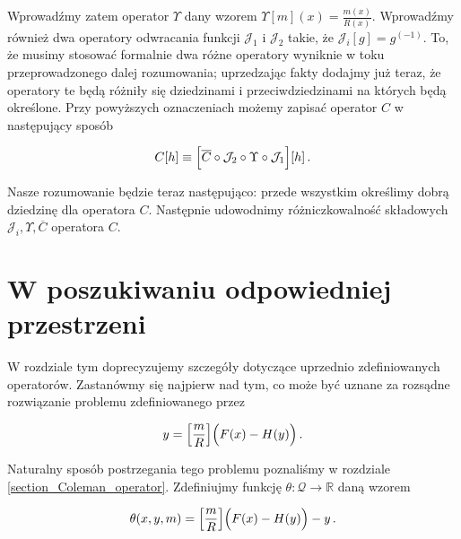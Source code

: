 Wprowadźmy zatem operator $\Upsilon$ dany wzorem $\Upsilon[m](x)= \frac{m(x)}{R(x)}$. Wprowadźmy również dwa operatory odwracania funkcji $\mathcal{J}_1$ i $\mathcal{J}_2$ takie, że $\mathcal{J}_i [g] = g^{(-1)}$. To, że musimy stosować formalnie dwa różne operatory wyniknie w toku przeprowadzonego dalej rozumowania; uprzedzając fakty dodajmy już teraz, że operatory te będą różniły się dziedzinami i przeciwdziedzinami na których będą określone. Przy powyższych oznaczeniach możemy zapisać operator $C$ w następujący sposób

\begin{equation*}
	C[h] \equiv \Bigl[\overline{C} \circ \mathcal{J}_2 \circ \Upsilon \circ \mathcal{J}_1 \Bigl][h]\,.
\end{equation*}

Nasze rozumowanie będzie teraz następująco: przede wszystkim określimy dobrą dziedzinę dla operatora $C$. Następnie udowodnimy różniczkowalność składowych $\mathcal{J}_i, \Upsilon, \overline{C}$ operatora $C$.




\section{W poszukiwaniu odpowiedniej przestrzeni}\label{chap_right_space}


W rozdziale tym doprecyzujemy szczegóły dotyczące uprzednio zdefiniowanych operatorów. Zastanówmy się najpierw nad tym, co może być uznane za rozsądne rozwiązanie problemu zdefiniowanego przez

\begin{equation*}
y= \Bigl [\frac{m}{R}\Bigl] \Big ( F(x) - H(y) \Big)\,.
\end{equation*}

Naturalny sposób postrzegania tego problemu poznaliśmy w rozdziale \ref{section_Coleman_operator}. Zdefiniujmy funkcję $\theta: \mathcal{Q} \rightarrow \mathbb{R}$ daną wzorem

\begin{equation*}
\theta(x,y,m) = \Bigl [\frac{m}{R}\Bigl] \Big ( F(x) - H(y) \Big) - y\,.
\end{equation*}

